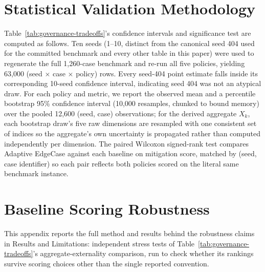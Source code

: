 \documentclass[letterpaper]{article} %
\begin{document}
\section{Statistical Validation Methodology}
\label{app:statistical-methodology}
Table~\ref{tab:governance-tradeoffs}'s confidence intervals and significance test are computed as follows. Ten seeds (1--10, distinct from the canonical seed 404 used for the committed benchmark and every other table in this paper) were used to regenerate the full 1,260-case benchmark and re-run all five policies, yielding 63,000 (seed $\times$ case $\times$ policy) rows. Every seed-404 point estimate falls inside its corresponding 10-seed confidence interval, indicating seed 404 was not an atypical draw. For each policy and metric, we report the observed mean and a percentile bootstrap 95\% confidence interval (10,000 resamples, chunked to bound memory) over the pooled 12,600 (seed, case) observations; for the derived aggregate $X_k$, each bootstrap draw's five raw dimensions are resampled with one consistent set of indices so the aggregate's own uncertainty is propagated rather than computed independently per dimension. The paired Wilcoxon signed-rank test compares Adaptive EdgeCase against each baseline on mitigation score, matched by (seed, case identifier) so each pair reflects both policies scored on the literal same benchmark instance.

\section{Baseline Scoring Robustness}
\label{app:baseline-scoring-robustness}
This appendix reports the full method and results behind the robustness claims in Results and Limitations: independent stress tests of Table~\ref{tab:governance-tradeoffs}'s aggregate-externality comparison, run to check whether its rankings survive scoring choices other than the single reported convention.
\end{document}
